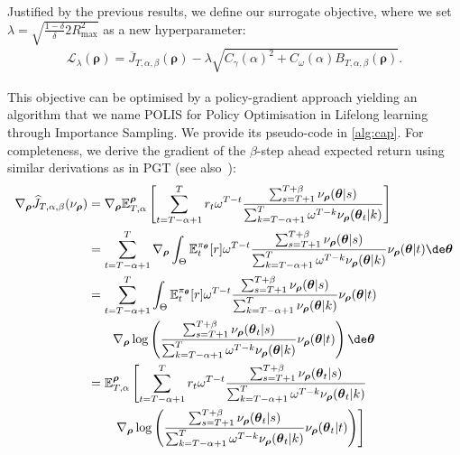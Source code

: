 Justified by the previous results, we define our surrogate objective, where we set $\textstyle\lambda = \sqrt{\frac{1-\delta}{\delta} 2 R_{\max}^2 }$ as a new hyperparameter:
\begin{align}
    \mathcal{L}_{\lambda}(\boldsymbol\rho) = \overline{J}_{T,\alpha,\beta}(\boldsymbol\rho) - \lambda  \sqrt{C_\gamma(\alpha)^2+C_\omega(\alpha) B_{T,\alpha,\beta}(\boldsymbol\rho)}.
    \label{eq:objective}
\end{align}

This objective can be optimised by a policy-gradient approach yielding an algorithm that we name POLIS for Policy Optimisation in Lifelong learning through Importance Sampling. We provide its pseudo-code in \cref{alg:cap}. 
For completeness, we derive the gradient of the $\beta$-step ahead expected return using similar derivations as in PGT \cite{williams1992simple} (see also~):
\begin{align*}
    \nabla_{\boldsymbol\rho} \widehat{J}_{T,\alpha,\beta}(\nu_{\boldsymbol\rho}) 
    &= \nabla_{\boldsymbol\rho} \mathbb{E}^{\boldsymbol\rho}_{T,\alpha} \left[ \sum_{t=T-\alpha+1}^{T} r_t \omega^{T-t} \frac{\sum_{s=T+1}^{T+\beta} \nu_{\boldsymbol\rho}(\boldsymbol\theta\vert s)}{\sum_{k=T-\alpha+1}^{T}\omega^{T-k} \nu_{\boldsymbol\rho} (\boldsymbol\theta_t \vert k)}\right] 
    \\
    &= \sum_{t=T-\alpha+1}^{T} \nabla_{\boldsymbol\rho} \int_{\Theta}  \mathbb{E}_{t}^{\pi_{\boldsymbol\theta}}[r] \omega^{T-t} \frac{\sum_{s=T+1}^{T+\beta} \nu_{\boldsymbol\rho}(\boldsymbol\theta\vert s)}{\sum_{k=T-\alpha+1}^{T}\omega^{T-k}\nu_{\boldsymbol\rho} (\boldsymbol\theta \vert k)}  \nu_{\boldsymbol\rho} (\boldsymbol\theta \vert t)\de\boldsymbol\theta
    \\
    &=  \sum_{t=T-\alpha+1}^{T} \int_{\Theta}   \mathbb{E}_{t}^{\pi_{\boldsymbol\theta}}[r] \omega^{T-t} \frac{\sum_{s=T+1}^{T+\beta} \nu_{\boldsymbol\rho}(\boldsymbol\theta\vert s)}{\sum_{k=T-\alpha+1}^{T}\nu_{\boldsymbol\rho} (\boldsymbol\theta \vert k)}  \nu_{\boldsymbol\rho} (\boldsymbol\theta \vert t)
    \\ 
    &\qquad \nabla_{\boldsymbol\rho}  \log\left( \frac{\sum_{s=T+1}^{T+\beta} \nu_{\boldsymbol\rho}(\boldsymbol\theta_t\vert s)}{\sum_{k=T-\alpha+1}^{T}\omega^{T-k}\nu_{\boldsymbol\rho} (\boldsymbol\theta \vert k)}  \nu_{\boldsymbol\rho} (\boldsymbol\theta \vert t) \right) \de\boldsymbol\theta
    \\ 
    &= \mathbb{E}^{\boldsymbol\rho}_{T,\alpha}\left[  \sum_{t=T-\alpha+1}^{T} r_t \omega^{T-t} \frac{\sum_{s=T+1}^{T+\beta} \nu_{\boldsymbol\rho}(\boldsymbol\theta_t\vert s)}{\sum_{k=T-\alpha+1}^{T}\omega^{T-k}\nu_{\boldsymbol\rho} (\boldsymbol\theta_t \vert k)} \right. 
    \\
    &\qquad \left.\nabla_{\boldsymbol\rho} \log \left( \frac{\sum_{s=T+1}^{T+\beta} \nu_{\boldsymbol\rho}(\boldsymbol\theta_t\vert s)}{\sum_{k=T-\alpha+1}^{T}\omega^{T-k}\nu_{\boldsymbol\rho} (\boldsymbol\theta_t \vert k)}  \nu_{\boldsymbol\rho} (\boldsymbol\theta_t \vert t) \right)\right]
\end{align*}


